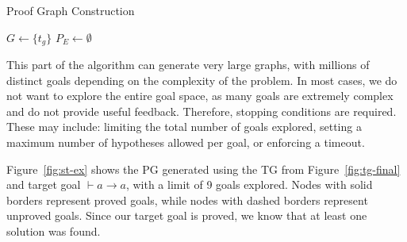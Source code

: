 \begin{algorithm}
\caption{Proof Graph Construction}
\label{alg:pg-construction}

$G \leftarrow \{t_g\}$ 
$P_E \leftarrow \emptyset$ 

\end{algorithm}

This part of the algorithm can generate very large graphs, with millions of distinct goals depending on the complexity of the problem. In most cases, we do not want to explore the entire goal space, as many goals are extremely complex and do not provide useful feedback. Therefore, stopping conditions are required. These may include: limiting the total number of goals explored, setting a maximum number of hypotheses allowed per goal, or enforcing a timeout.

Figure~\ref{fig:st-ex} shows the PG generated using the TG from Figure~\ref{fig:tg-final} and target goal \(\vdash a \to a\), with a limit of 9 goals explored. Nodes with solid borders represent proved goals, while nodes with dashed borders represent unproved goals. Since our target goal is proved, we know that at least one solution was found.

